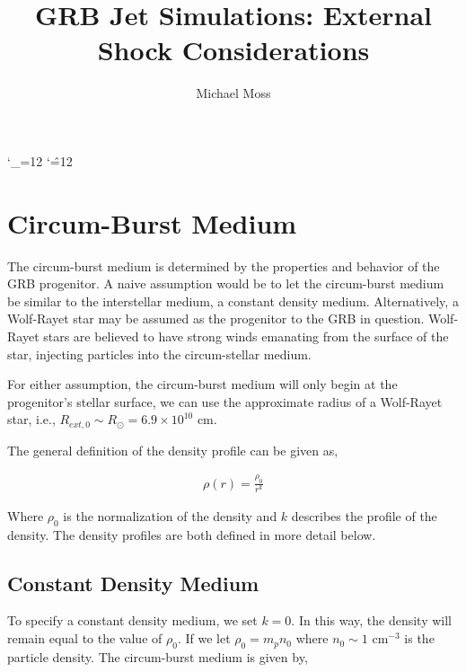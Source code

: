 \documentclass[linenumbers,twocolumn]{aastex631}
\def\upsubscripts{\catcode`\_=12 } \def\normalsubscripts{\catcode`\_=8 }
\def\upsupscripts{\catcode`\^=12 } \def\normalsupscripts{\catcode`\^=7 }
\begin{document}
\upsubscripts
\upsupscripts
\title{GRB Jet Simulations: External Shock Considerations}

\author{Michael Moss}





\section{Circum-Burst Medium} \label{sec: circum-burst medium}

The circum-burst medium is determined by the properties and behavior of the GRB progenitor. A naive assumption would be to let the circum-burst medium be similar to the interstellar medium, a constant density medium. Alternatively, a Wolf-Rayet star may be assumed as the progenitor to the GRB in question. Wolf-Rayet stars are believed to have strong winds emanating from the surface of the star, injecting particles into the circum-stellar medium. 

For either assumption, the circum-burst medium will only begin at the progenitor's stellar surface, we can use the approximate radius of a Wolf-Rayet star, i.e., $ R_{ext,0} \sim R_{\odot} = 6.9\times10^{10}$ cm.  

The general definition of the density profile can be given as, 

\begin{align}
	\rho(r) = \frac{\rho_0}{r^k}
\end{align}

Where $\rho_0$ is the normalization of the density and $k$ describes the profile of the density. The density profiles are both defined in more detail below.

\subsection{Constant Density Medium}

To specify a constant density medium, we set $k=0$. In this way, the density will remain equal to the value of $\rho_0$. If we let $\rho_0 = m_pn_0$ where $n_0\sim 1$ cm$^{-3}$ is the particle density. The circum-burst medium is given by,
\end{document}
